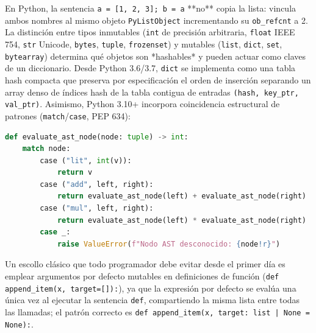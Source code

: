 \documentclass{book}
\begin{document}
En Python, la sentencia \texttt{a = [1, 2, 3]; b = a} **no** copia la lista: vincula ambos nombres al mismo objeto \texttt{PyListObject} incrementando su \texttt{ob\_refcnt} a 2. La distinción entre tipos inmutables (\texttt{int} de precisión arbitraria, \texttt{float} IEEE 754, \texttt{str} Unicode, \texttt{bytes}, \texttt{tuple}, \texttt{frozenset}) y mutables (\texttt{list}, \texttt{dict}, \texttt{set}, \texttt{bytearray}) determina qué objetos son *hashables* y pueden actuar como claves de un diccionario. Desde Python 3.6/3.7, \texttt{dict} se implementa como una tabla hash compacta que preserva por especificación el orden de inserción separando un array denso de índices hash de la tabla contigua de entradas \texttt{(hash, key\_ptr, val\_ptr)}. Asimismo, Python 3.10+ incorpora coincidencia estructural de patrones (\texttt{match}/\texttt{case}, PEP 634):
\begin{lstlisting}[style=studium,language={Python}]
def evaluate_ast_node(node: tuple) -> int:
    match node:
        case ("lit", int(v)):
            return v
        case ("add", left, right):
            return evaluate_ast_node(left) + evaluate_ast_node(right)
        case ("mul", left, right):
            return evaluate_ast_node(left) * evaluate_ast_node(right)
        case _:
            raise ValueError(f"Nodo AST desconocido: {node!r}")
\end{lstlisting}
Un escollo clásico que todo programador debe evitar desde el primer día es emplear argumentos por defecto mutables en definiciones de función (\texttt{def append\_item(x, target=[]):}), ya que la expresión por defecto se evalúa una única vez al ejecutar la sentencia \texttt{def}, compartiendo la misma lista entre todas las llamadas; el patrón correcto es \texttt{def append\_item(x, target: list | None = None):}.
\end{document}
